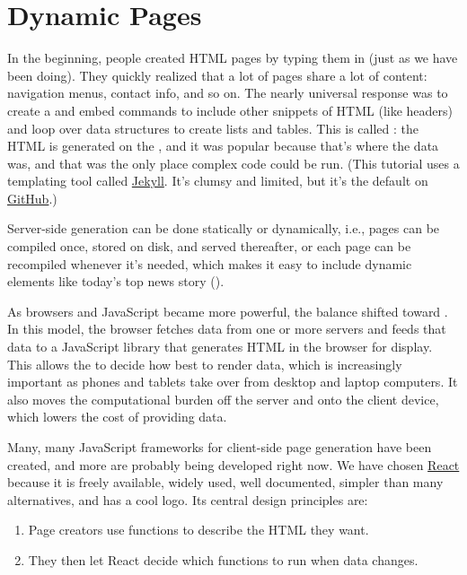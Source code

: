 \chapter{Dynamic Pages}\label{s:dynamic}

In the beginning,
people created HTML pages by typing them in (just as we have been doing).
They quickly realized that a lot of pages share a lot of content:
navigation menus, contact info, and so on.
The nearly universal response was to create a 
and embed commands to include other snippets of HTML (like headers)
and loop over data structures to create lists and tables.
This is called :
the HTML is generated on the ,
and it was popular because that's where the data was,
and that was the only place complex code could be run.
(This tutorial uses a templating tool called \href{https://jekyllrb.com/}{Jekyll}.
It's clumsy and limited, but it's the default on \href{http://github.com/}{GitHub}.)

Server-side generation can be done statically or dynamically,
i.e.,
pages can be compiled once, stored on disk, and served thereafter,
or each page can be recompiled whenever it's needed,
which makes it easy to include dynamic elements like today's top news story
().


As browsers and JavaScript became more powerful,
the balance shifted toward .
In this model,
the browser fetches data from one or more servers
and feeds that data to a JavaScript library that generates HTML in the browser for display.
This allows the  to decide how best to render data,
which is increasingly important as phones and tablets take over
from desktop and laptop computers.
It also moves the computational burden off the server
and onto the client device,
which lowers the cost of providing data.

Many, many JavaScript frameworks for client-side page generation have been created,
and more are probably being developed right now.
We have chosen \href{https://reactjs.org/}{React} because it is freely available,
widely used,
well documented,
simpler than many alternatives,
and has a cool logo.
Its central design principles are:

\begin{enumerate}
\item
  Page creators use functions to describe the HTML they want.
\item
  They then let React decide which functions to run when data changes.
\end{enumerate}

